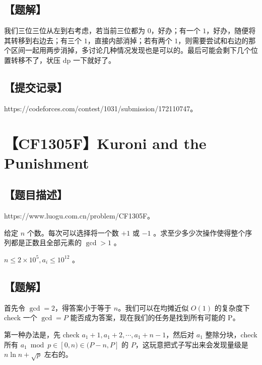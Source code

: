 \documentclass[UTF8,12pt,a4paper]{ctexart}
\begin{document}
	\subsection*{【题解】}
	
	我们三位三位从左到右考虑，若当前三位都为 $0$，好办；有一个 $1$，好办，随便将其转移到右边去；有三个 $1$，直接内部消掉；若有两个 $1$，则需要尝试和右边的那个区间一起用两步消掉，多讨论几种情况发现也是可以的。最后可能会剩下几个位置转移不了，状压 dp 一下就好了。
	
	\subsection*{【提交记录】}
	
	https://codeforces.com/contest/1031/submission/172110747。
	
	
	\section*{【CF1305F】Kuroni and the Punishment}
	
	\subsection*{【题目描述】}
	
	https://www.luogu.com.cn/problem/CF1305F。
	
	给定 $n$ 个数。每次可以选择将一个数 $+1$ 或 $-1$ 。求至少多少次操作使得整个序列都是正数且全部元素的 $\gcd>1$ 。
	
	$n\leq 2\times10^5,a_i\leq 10^{12}$ 。
	
	\subsection*{【题解】}
	
	首先令 $\gcd = 2$，得答案小于等于 $n$。我们可以在均摊近似 $O(1)$ 的复杂度下 check 一个 $\gcd = P$ 能否成为答案，现在我们的任务是找到所有可能的 P。
	
	第一种办法是，先 check $a_1+1,a_1+2,\cdots,a_1+n-1$，然后对 $a_1$ 整除分块，check 所有 $a_1 \bmod p \in [0,n)\in (P-n,P]$ 的 $P$，这玩意把式子写出来会发现量级是 $n\ln n+\sqrt{p}$ 左右的。
	
\end{document}
